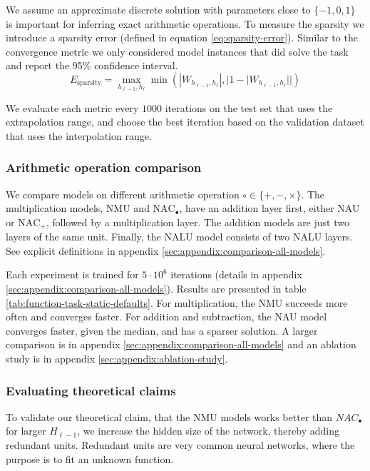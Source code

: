 We assume an approximate discrete solution with parameters close to $\{-1, 0, 1\}$ is important for inferring exact arithmetic operations.
To measure the sparsity we introduce a sparsity error (defined in equation \ref{eq:sparsity-error}).
Similar to the convergence metric we only considered model instances that did solve the task and report the 95\% confidence interval.
\begin{equation}
E_\mathrm{sparsity} = \max_{h_{\ell-1}, h_{\ell}} \min(|W_{h_{\ell-1},h_\ell}|, |1 - |W_{h_{\ell-1},h_\ell}||)
\label{eq:sparsity-error}
\end{equation}

We evaluate each metric every $1000$ iterations on the test set that uses the extrapolation range, and choose the best iteration based on the validation dataset that uses the interpolation range.

\subsubsection{Arithmetic operation comparison}
We compare models on different arithmetic operation $\circ \in \{+, -, \times\}$. The multiplication models, NMU and $\mathrm{NAC}_{\bullet}$, have an addition layer first, either NAU or $\mathrm{NAC}_{+}$, followed by a multiplication layer. The addition models are just two layers of the same unit. Finally, the NALU model consists of two NALU layers. See explicit definitions in appendix \ref{sec:appendix:comparison-all-models}.

Each experiment is trained for $5 \cdot 10^6$ iterations (details in appendix \ref{sec:appendix:comparison-all-models}). Results are presented in table \ref{tab:function-task-static-defaults}. For multiplication, the NMU succeeds more often and converges faster. For addition and subtraction, the NAU model converges faster, given the median, and has a sparser solution. A larger comparison is in appendix \ref{sec:appendix:comparison-all-models} and an ablation study is in appendix \ref{sec:appendix:ablation-study}.



\subsubsection{Evaluating theoretical claims}

To validate our theoretical claim, that the NMU models works better than $NAC_{\bullet}$ for larger $H_{\ell-1}$, we increase the hidden size of the network, thereby adding redundant units. Redundant units are very common neural networks, where the purpose is to fit an unknown function.

